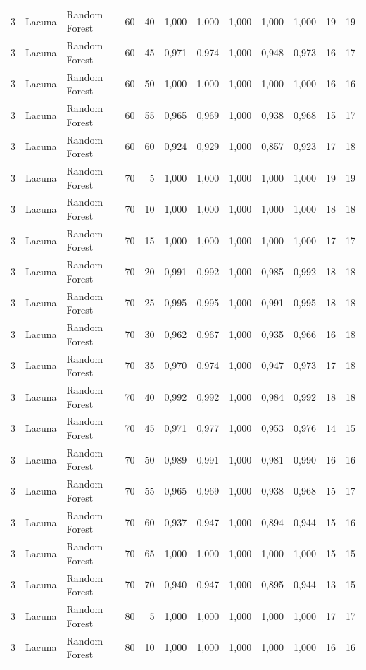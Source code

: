 \begin{longtable}{@{}rllrrrrrrrrr@{}}
3 & Lacuna & Random Forest & 60 & 40 & 1,000 & 1,000 & 1,000 & 1,000 & 1,000 & 19 & 19 \\
3 & Lacuna & Random Forest & 60 & 45 & 0,971 & 0,974 & 1,000 & 0,948 & 0,973 & 16 & 17 \\
3 & Lacuna & Random Forest & 60 & 50 & 1,000 & 1,000 & 1,000 & 1,000 & 1,000 & 16 & 16 \\
3 & Lacuna & Random Forest & 60 & 55 & 0,965 & 0,969 & 1,000 & 0,938 & 0,968 & 15 & 17 \\
3 & Lacuna & Random Forest & 60 & 60 & 0,924 & 0,929 & 1,000 & 0,857 & 0,923 & 17 & 18 \\
3 & Lacuna & Random Forest & 70 & 5 & 1,000 & 1,000 & 1,000 & 1,000 & 1,000 & 19 & 19 \\
3 & Lacuna & Random Forest & 70 & 10 & 1,000 & 1,000 & 1,000 & 1,000 & 1,000 & 18 & 18 \\
3 & Lacuna & Random Forest & 70 & 15 & 1,000 & 1,000 & 1,000 & 1,000 & 1,000 & 17 & 17 \\
3 & Lacuna & Random Forest & 70 & 20 & 0,991 & 0,992 & 1,000 & 0,985 & 0,992 & 18 & 18 \\
3 & Lacuna & Random Forest & 70 & 25 & 0,995 & 0,995 & 1,000 & 0,991 & 0,995 & 18 & 18 \\
3 & Lacuna & Random Forest & 70 & 30 & 0,962 & 0,967 & 1,000 & 0,935 & 0,966 & 16 & 18 \\
3 & Lacuna & Random Forest & 70 & 35 & 0,970 & 0,974 & 1,000 & 0,947 & 0,973 & 17 & 18 \\
3 & Lacuna & Random Forest & 70 & 40 & 0,992 & 0,992 & 1,000 & 0,984 & 0,992 & 18 & 18 \\
3 & Lacuna & Random Forest & 70 & 45 & 0,971 & 0,977 & 1,000 & 0,953 & 0,976 & 14 & 15 \\
3 & Lacuna & Random Forest & 70 & 50 & 0,989 & 0,991 & 1,000 & 0,981 & 0,990 & 16 & 16 \\
3 & Lacuna & Random Forest & 70 & 55 & 0,965 & 0,969 & 1,000 & 0,938 & 0,968 & 15 & 17 \\
3 & Lacuna & Random Forest & 70 & 60 & 0,937 & 0,947 & 1,000 & 0,894 & 0,944 & 15 & 16 \\
3 & Lacuna & Random Forest & 70 & 65 & 1,000 & 1,000 & 1,000 & 1,000 & 1,000 & 15 & 15 \\
3 & Lacuna & Random Forest & 70 & 70 & 0,940 & 0,947 & 1,000 & 0,895 & 0,944 & 13 & 15 \\
3 & Lacuna & Random Forest & 80 & 5 & 1,000 & 1,000 & 1,000 & 1,000 & 1,000 & 17 & 17 \\
3 & Lacuna & Random Forest & 80 & 10 & 1,000 & 1,000 & 1,000 & 1,000 & 1,000 & 16 & 16 \\

\end{longtable}
